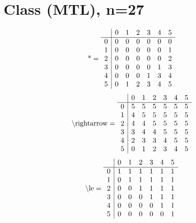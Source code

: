 \documentclass[11pt]{article}
\begin{document}
\section{Class (MTL), n=27}
\[\text{*} = 
\begin{array}{r | r r r r r r}
 & 0 & 1 & 2 & 3 & 4 & 5 \\ \hline
0 & 0 & 0 & 0 & 0 & 0 & 0 \\
1 & 0 & 0 & 0 & 0 & 0 & 1 \\
2 & 0 & 0 & 0 & 0 & 0 & 2 \\
3 & 0 & 0 & 0 & 0 & 1 & 3 \\
4 & 0 & 0 & 0 & 1 & 3 & 4 \\
5 & 0 & 1 & 2 & 3 & 4 & 5 \\
\end{array}
\]
\[\text{\textbackslash rightarrow} = 
\begin{array}{r | r r r r r r}
 & 0 & 1 & 2 & 3 & 4 & 5 \\ \hline
0 & 5 & 5 & 5 & 5 & 5 & 5 \\
1 & 4 & 5 & 5 & 5 & 5 & 5 \\
2 & 4 & 4 & 5 & 5 & 5 & 5 \\
3 & 3 & 4 & 4 & 5 & 5 & 5 \\
4 & 2 & 3 & 3 & 4 & 5 & 5 \\
5 & 0 & 1 & 2 & 3 & 4 & 5 \\
\end{array}
\]
\[\text{\textbackslash le} = 
\begin{array}{r | r r r r r r}
 & 0 & 1 & 2 & 3 & 4 & 5 \\ \hline
0 & 1 & 1 & 1 & 1 & 1 & 1 \\
1 & 0 & 1 & 1 & 1 & 1 & 1 \\
2 & 0 & 0 & 1 & 1 & 1 & 1 \\
3 & 0 & 0 & 0 & 1 & 1 & 1 \\
4 & 0 & 0 & 0 & 0 & 1 & 1 \\
5 & 0 & 0 & 0 & 0 & 0 & 1 \\
\end{array}
\]
\end{document}
